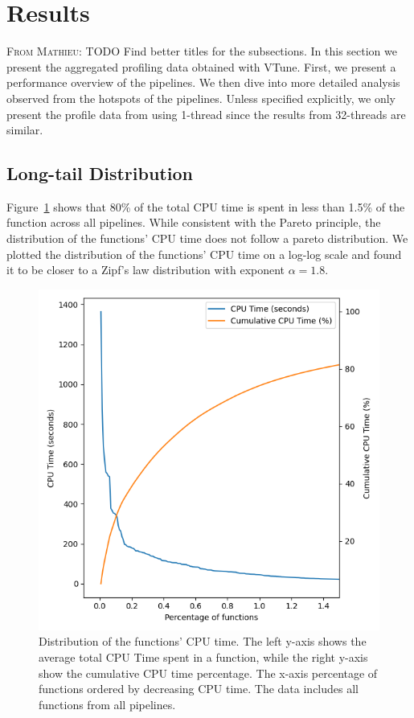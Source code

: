 \documentclass[conference]{IEEEtran}
\newcommand{\MD}[1]{\color{magenta}\textsc{From Mathieu: }#1\color{black}}
\begin{document}
\section{Results}
\MD{TODO Find better titles for the subsections.}
In this section we present the aggregated profiling data obtained with VTune. First, we present a performance overview of the pipelines. We then dive into more detailed analysis observed from the hotspots of the pipelines. Unless specified explicitly, we only present the profile data from using 1-thread since the results from 32-threads are similar.

\subsection{Long-tail Distribution}
Figure~\ref{fig:long-tail-distribution} shows that 80\% of the total CPU time is spent in less than 1.5\% of the function across all pipelines. While consistent with the Pareto principle, the distribution of the functions' CPU time does not follow a pareto distribution. We plotted the distribution of the functions' CPU time on a log-log scale and found it to be closer to a Zipf's law distribution with exponent $\alpha=1.8$.

\begin{figure}[ht!]
	\centering
	\includegraphics[width=\linewidth]{figures/global-longtail.png}
	\caption{Distribution of the functions' CPU time. The left y-axis shows the average total CPU Time spent in a function, while the right y-axis show the cumulative CPU time percentage. The x-axis percentage of functions ordered by decreasing CPU time. The data includes all functions from all pipelines.}
	\label{fig:long-tail-distribution}
\end{figure}
	
\end{document}
